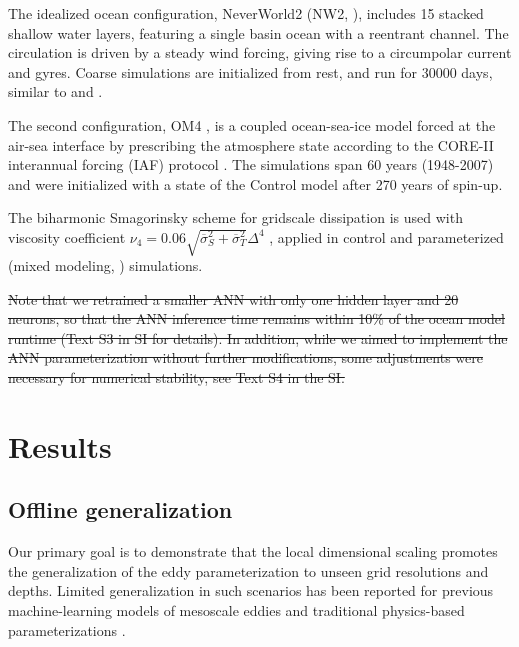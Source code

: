 \documentclass[draft]{agujournal2019}
\providecommand{\DIFdel}[1]{{\protect\color{red}\sout{#1}}}                      %
\providecommand{\DIFdelbegin}{} %
\providecommand{\DIFdelend}{} %
\begin{document}
The idealized ocean configuration, NeverWorld2 (NW2, ), includes 15 stacked shallow water layers, featuring a single basin ocean with a reentrant channel. The circulation is driven by a steady wind forcing, giving rise to a circumpolar current and gyres. Coarse simulations are initialized from rest, and run for $30000$ days, similar to  and .

The second configuration, OM4 \cite{adcroft2019gfdl}, is a coupled ocean-sea-ice model forced at the air-sea interface by prescribing the atmosphere state according to the CORE-II interannual forcing (IAF) protocol \cite{large2009global}. The simulations span 60 years (1948-2007) and were initialized with a state of the Control model after 270 years of spin-up.

The biharmonic Smagorinsky scheme for gridscale dissipation is used with viscosity coefficient $\nu_4 = 0.06 \sqrt{\overline{\sigma}_S^2+\overline{\sigma}_T^2} \Delta^4$   \cite{adcroft2019gfdl}, applied in control and parameterized (mixed modeling, ) simulations. 




\DIFdelbegin \DIFdel{Note that we retrained a smaller ANN with only one hidden layer and 20 neurons, so that the ANN inference time remains within 10\% of the ocean model runtime (Text S3 in SI for details). In addition, while we aimed to implement the ANN parameterization without further modifications, some adjustments were necessary for numerical stability, see Text S4 in the SI.
}%

\DIFdelend \section{Results}

\subsection{Offline generalization}
Our primary goal is to demonstrate that the local dimensional scaling promotes the generalization of the eddy parameterization to unseen grid resolutions and depths. Limited generalization in such scenarios has been reported for previous machine-learning models of mesoscale eddies \cite{zhang2023implementation, gultekin2024analysis,ross2022benchmarking} and traditional physics-based parameterizations \cite{yankovsky2024}. 
\end{document}
